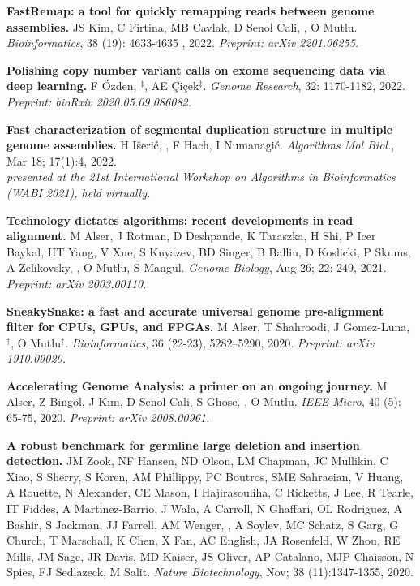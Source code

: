 \vspace{-.2cm}
{\bf FastRemap: a tool for quickly remapping reads between genome assemblies.}
JS Kim, C Firtina, MB Cavlak, D Senol Cali, \calkan{}, O Mutlu.
{\it Bioinformatics}, 38 (19): 4633-4635 , 2022. \textit {Preprint: arXiv 2201.06255.}

\vspace{-.2cm}
{\bf Polishing copy number variant calls on exome sequencing data via deep learning.}
F Özden, \calkan{}$^\ddag$, AE Çiçek$^\ddag$. {\it Genome Research}, 32: 1170-1182, 2022. \textit {Preprint: bioRxiv 2020.05.09.086082.}


\vspace{-.2cm}
{\bf Fast characterization of segmental duplication structure in multiple genome assemblies.}
H Išerić, \calkan{}, F Hach, I Numanagić.
{\it Algorithms Mol Biol.}, Mar 18; 17(1):4, 2022.\\
         \hspace*{1cm}
          {\footnotesize \em presented at the 21st International Workshop on Algorithms in Bioinformatics (WABI 2021), held virtually.}


\vspace{-.2cm}
{\bf Technology dictates algorithms: recent developments in read alignment.}
M Alser, J Rotman, D Deshpande, K Taraszka, H Shi, P Icer Baykal, HT Yang, V Xue, S Knyazev, BD Singer, B Balliu, D Koslicki, P Skums, A Zelikovsky, \calkan{}, O Mutlu, S Mangul.
{\it Genome Biology}, Aug 26; 22: 249, 2021.
\textit{Preprint: arXiv 2003.00110.}

\vspace{-.2cm}
{\bf SneakySnake: a fast and accurate universal genome pre-alignment filter for CPUs, GPUs, and FPGAs.} M Alser, T Shahroodi, J Gomez-Luna, \calkan{}$^\ddag$, O Mutlu$^\ddag$. {\it Bioinformatics}, 36 (22-23), 5282–5290, 2020. \textit {Preprint: arXiv 1910.09020.}

\vspace{-.2cm}
{\bf Accelerating Genome Analysis: a primer on an ongoing journey.} M Alser, Z Bingöl, J Kim, D Senol Cali, S Ghose, \calkan{}, O Mutlu. {\it IEEE Micro}, 40 (5): 65-75, 2020. \textit{Preprint: arXiv 2008.00961.}

\vspace{-.2cm}
 {\bf A robust benchmark for germline large deletion and insertion detection.}
 JM Zook, NF Hansen, ND Olson, LM Chapman, JC Mullikin, C Xiao, S Sherry, S Koren, AM Phillippy, PC Boutros, SME Sahraeian, V Huang, A Rouette, N Alexander, CE Mason, I Hajirasouliha, C Ricketts, J Lee, R Tearle, IT Fiddes, A Martinez-Barrio, J Wala, A Carroll, N Ghaffari, OL Rodriguez, A Bashir, S Jackman, JJ Farrell, AM Wenger, \calkan{}, A Soylev, MC Schatz, S Garg, G Church, T Marschall, K Chen, X Fan, AC English, JA Rosenfeld, W Zhou, RE Mills, JM Sage, JR Davis, MD Kaiser, JS Oliver, AP Catalano, MJP Chaisson, N Spies, FJ Sedlazeck, M Salit.
 {\it Nature Biotechnology}, Nov;  38 (11):1347-1355, 2020.
 
